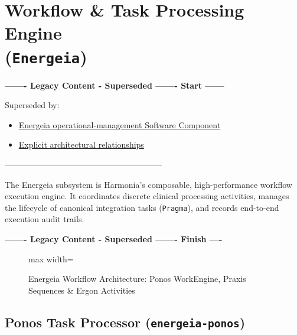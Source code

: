 
\chapter[Workflow \& Task Processing Engine (Energeia)]{Workflow \& Task Processing Engine\\(\texttt{Energeia})}
\label{chap:workflow_energeia}

\par\noindent\textbf{------- Legacy Content - Superseded ------- Start ------}
\par\noindent Superseded by:
\begin{itemize}
  \item \href{../../markdown/05-information-systems-architecture/component-register.md\#c39}{Energeia operational-management Software Component}
  \item \href{../../markdown/05-information-systems-architecture/candidate-system-map.md\#specialisation-and-reuse}{Explicit architectural relationships}
\end{itemize}
\noindent ---------------------------------------------------------

The Energeia subsystem is Harmonia's composable, high-performance workflow execution engine. It coordinates discrete clinical processing activities, manages the lifecycle of canonical integration tasks (\texttt{Pragma}), and records end-to-end execution audit trails.

\par\noindent\textbf{------- Legacy Content - Superseded ------- Finish ----}


\begin{figure}[htbp]
    \centering
    \begin{adjustbox}{max width=\textwidth}
        
    \end{adjustbox}
    \caption{Energeia Workflow Architecture: Ponos WorkEngine, Praxis Sequences \& Ergon Activities}
    \label{fig:energeia_workflow}
\end{figure}

\section{Ponos Task Processor (\texttt{energeia-ponos})}

